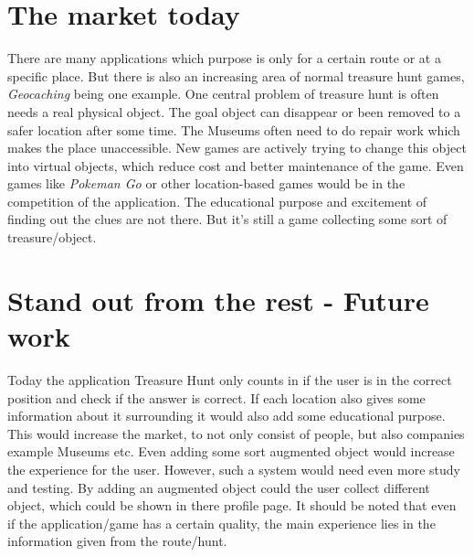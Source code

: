 \documentclass{TDP003mall}
\begin{document}
\section{The market today}
There are many applications which purpose is only for a certain route or at a specific place.
But there is also an increasing area of normal treasure hunt games, \textit{Geocaching} being one example.
One central problem of treasure hunt is often needs a real physical object. The goal
object can disappear or been removed to a safer location after some time. The Museums often need
to do repair work which makes the place unaccessible. New games are actively
trying to change this object into virtual objects, which reduce cost and better maintenance of
the game\cite{zsolt12}\cite{ridho17}.
Even games like \textit{Pokeman Go} or other location-based games would be in the competition
of the application. The educational purpose and excitement of finding out the clues are not there.
But it's still a game collecting some sort of treasure/object.

\section{Stand out from the rest - Future work}
Today the application Treasure Hunt only counts in if the user is in the correct position and check if the
answer is correct. If each location also gives some information about it surrounding it would
also add some educational purpose. This would increase the market, to not only consist of
people, but also companies example Museums etc.
Even adding some sort augmented object would increase the experience for the user. However,
such a system would need even more study and testing. By adding an augmented object could
the user collect different object, which could be shown in there profile page. 
It should be noted that even if the application/game has a certain quality, the main experience
lies in the information given from the route/hunt.



\end{document}
